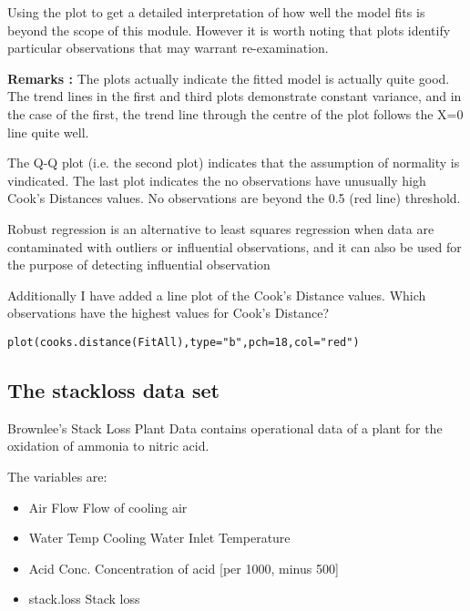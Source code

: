 \documentclass[main.tex]{subfiles}
\begin{document}
Using the plot to get a detailed interpretation of how well the model fits is beyond the scope of this module. However it is worth noting that plots identify particular observations that may warrant re-examination. 

\textbf{Remarks :} 
The plots actually indicate the fitted model is actually quite good. The trend lines in the first and third plots demonstrate constant variance, and in the case of the first, the trend line through the centre of the plot  follows the X=0 line quite well.

The Q-Q plot (i.e. the second plot) indicates that the assumption of normality is vindicated.
The last plot indicates the no observations have unusually high Cook’s Distances values.  No observations are beyond the 0.5 (red line) threshold.

Robust regression is an alternative to least squares regression when data are contaminated with outliers or influential observations, and it can also be used for the purpose of detecting influential observation


Additionally I have added a line plot of the Cook’s Distance values. Which observations have the highest values for Cook’s Distance?

\begin{framed}
\begin{verbatim}
plot(cooks.distance(FitAll),type="b",pch=18,col="red")
\end{verbatim}
\end{framed}





\subsection{The stackloss data set}
Brownlee's Stack Loss Plant Data contains operational data of a plant for the oxidation of ammonia to nitric acid.

The variables are: 
\begin{itemize}
\item	Air Flow	 Flow of cooling air
\item	Water Temp	 Cooling Water Inlet Temperature
\item	Acid Conc.	 Concentration of acid [per 1000, minus 500]
\item	stack.loss	 Stack loss
\end{itemize}
\end{document}
